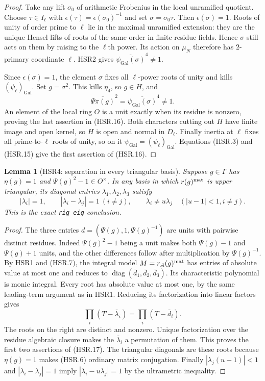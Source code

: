 \documentclass[11pt,a4paper]{article}
\numberwithin{equation}{section}
\newtheorem{lemma}[theorem]{Lemma}
\theoremstyle{remark}\newtheorem{remark}[theorem]{Remark}
\begin{document}
\begin{proof}
Take any lift $\sigma_0$ of arithmetic Frobenius in the local
unramified quotient.  Choose $\tau\in I_\ell$ with
$\epsilon(\tau)=\epsilon(\sigma_0)^{-1}$ and set
$\sigma=\sigma_0\tau$.  Then $\epsilon(\sigma)=1$.
Roots of unity of order prime to $\ell$ lie in the maximal
unramified extension: they are the unique Hensel lifts of roots
of the same order in finite residue fields.  Hence $\sigma$
still acts on them by raising to the $\ell$th power.  Its action
on $\mu_N$ therefore has $2$-primary coordinate $\ell$.
HSR2 gives $\overline{\psi_{\mathrm{Gal}}(\sigma)}^4\ne1$.

Since $\epsilon(\sigma)=1$, the element $\sigma$ fixes all
$\ell$-power roots of unity and kills $(\psi_\ell)_{\mathrm{Gal}}$.
Set $g=\sigma^2$.  This kills $\eta_4$, so $g\in H$, and
\[
 \overline{\Psi\pi(g)}^2
   =\overline{\psi_{\mathrm{Gal}}(\sigma)}^4\ne1.
\]
An element of the local ring $O$ is a unit exactly when its residue
is nonzero, proving the last assertion in (HSR.16).
Both characters cutting out $H$ have finite image and open kernel,
so $H$ is open and normal in $D_\ell$.  Finally inertia at $\ell$
fixes all prime-to-$\ell$ roots of unity, so on it
$\psi_{\mathrm{Gal}}=(\psi_\ell)_{\mathrm{Gal}}$.
Equations (HSR.3) and (HSR.15) give the first assertion of
(HSR.16).
\end{proof}

\begin{lemma}[HSR4: separation in every triangular basis]
\label{claim:HSR4}
Suppose $g\in\Gamma$ has $\eta(g)=1$ and
$\Psi(g)^2-1\in O^\times$.  In any basis in which $r(g)^{\rm mat}$
is upper triangular, its diagonal entries $\lambda_1,\lambda_2,
\lambda_3$ satisfy
\[
 |\lambda_i|=1,\qquad |\lambda_i-\lambda_j|=1\ (i\ne j),
 \qquad \lambda_i\ne u\lambda_j\quad(|u-1|<1, i\ne j).
 \tag{HSR.17}
\]
This is the exact \texttt{rig\_\allowbreak eig} conclusion.
\end{lemma}
\begin{proof}
The three entries $d=(\Psi(g),1,\Psi(g)^{-1})$ are units with
pairwise distinct residues.  Indeed $\Psi(g)^2-1$ being a unit
makes both $\Psi(g)-1$ and $\Psi(g)+1$ units, and the other
differences follow after multiplication by $\Psi(g)^{-1}$.
By HSR1 and (HSR.7), the integral model $M=r_A(g)^{\rm mat}$
has entries of absolute value at most one and reduces to
$\operatorname{diag}(\bar d_1,\bar d_2,\bar d_3)$.
Its characteristic polynomial is monic integral.  Every root has
absolute value at most one, by the same leading-term argument as
in HSR1.  Reducing its factorization into linear factors gives
\[
 \prod_i(T-\bar\lambda_i)=\prod_i(T-\bar d_i).
\]
The roots on the right are distinct and nonzero.  Unique
factorization over the residue algebraic closure makes the
$\bar\lambda_i$ a permutation of them.  This proves the first
two assertions of (HSR.17).  The triangular diagonals are these
roots because $\eta(g)=1$ makes (HSR.6) ordinary matrix
conjugation.  Finally $|\lambda_j(u-1)|<1$ and
$|\lambda_i-\lambda_j|=1$ imply
$|\lambda_i-u\lambda_j|=1$ by the ultrametric inequality.
\end{proof}
\end{document}
